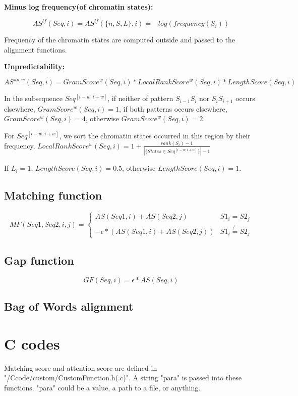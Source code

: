 \documentclass[a4paper]{article}
\begin{document}
\begin{CJK*}{UTF8}{kai}
\noindent
\textbf{Minus log frequency(of chromatin states):}

$$AS^{lf}(Seq,i) = AS^{lf}(\{n,S,L\},i) = -log(frequency(S_i))$$

Frequency of the chromatin states are computed outside and passed to the alignment functions.

\noindent
\textbf{Unpredictability:}

$$AS^{up,w}(Seq,i) = GramScore^w(Seq,i)*LocalRankScore^w(Seq,i)*LengthScore(Seq,i)$$

In the subsequence $Seq^{[i-w,i+w]}$, if neither of pattern $S_{i-1} S_i$ nor $S_i S_{i+1}$ occurs elsewhere, $GramScore^w(Seq,i)=1$, if both patterns occurs elsewhere, $GramScore^w(Seq,i)=4$, otherwise $GramScore^w(Seq,i)=2$.

For $Seq^{[i-w,i+w]}$, we sort the chromatin states occurred in this region by their frequency, $LocalRankScore^w(Seq,i)=1+\frac{rank(S_i)-1}{|\{States\in Seq^{[i-w,i+w]}\}|-1}$

If $L_i=1$, $LengthScore(Seq,i)=0.5$, otherwise $LengthScore(Seq,i)=1$.


\subsection{Matching function}

$$MF(Seq1,Seq2,i,j) = \left\{ \begin{array}{cc}
AS(Seq1,i)+AS(Seq2,j)&S1_i=S2_j\\
-\epsilon*(AS(Seq1,i)+AS(Seq2,j))&S1_i\not{=}S2_j
\end{array}\right.$$

\subsection{Gap function}

$$GF(Seq,i) = \epsilon*AS(Seq,i)$$

\subsection{Bag of Words alignment}

\section{C codes}

Matching score and attention score are defined in "/Ccode/custom/CustomFunction.h(.c)". A string "para" is passed into these functions. "para" could be a value, a path to a file, or anything.


\end{CJK*}
\end{document}

